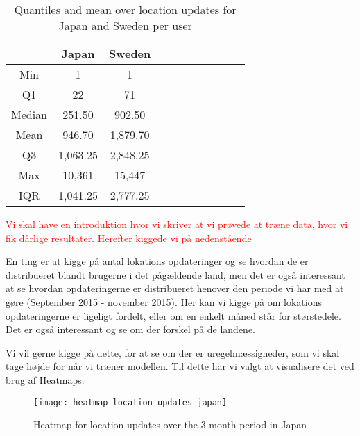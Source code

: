 \begin{table}[htbp]
        \centering
        \small
        \setlength\tabcolsep{2pt}
        \begin{tabular}{|c|c|c|c|c|c|c|c|c|c|c|}
            \hline
                         & Japan      &   Sweden      \\[-1pt]
            \hline
                 Min     &    1       &   1           \\
            \hline
                 Q1      &  22        &   71      \\
            \hline
                 Median  & 251.50     &   902.50      \\
            \hline
                 Mean    &  946.70   &  1,879.70     \\
            \hline
                 Q3      & 1,063.25    &   2,848.25     \\
            \hline
                 Max     &  10,361 &  15,447     \\
            \hline
                 IQR     &  1,041.25   &  2,777.25      \\
            \hline
            
        \end{tabular}
        \caption{Quantiles and mean over location updates for Japan and Sweden per user} %
        \label{tab:stat_loc_updates}
\end{table}

\textcolor{red}{Vi skal have en introduktion hvor vi skriver at vi prøvede at træne data, hvor vi fik dårlige resultater. Herefter kiggede vi på nedenstående}

En ting er at kigge på antal lokations opdateringer og se hvordan de er distribueret blandt brugerne i det pågældende land, men det er også interessant at se hvordan opdateringerne er distribueret henover den periode vi har med at gøre (September 2015 - november 2015). Her kan vi kigge på om lokations opdateringerne er ligeligt fordelt, eller om en enkelt måned står for størstedele. Det er også interessant og se om der forskel på de landene. 

Vi vil gerne kigge på dette, for at se om der er uregelmæssigheder, som vi skal tage højde for når vi træner modellen. 
 Til dette har vi valgt at visualisere det ved brug af Heatmaps. 
\begin{figure}[H]
    \centering
    \texttt{[image: heatmap\_location\_updates\_japan]}
    \caption{Heatmap for location updates over the 3 month period in Japan}
    \label{fig:heatmap_jap}
\end{figure}


